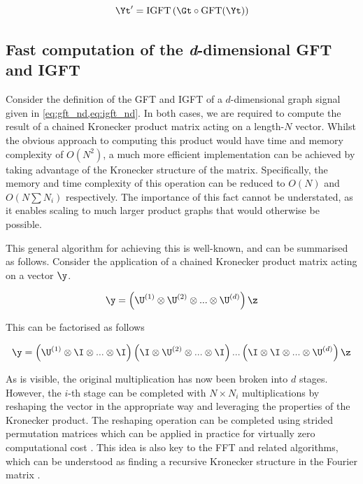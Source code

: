 \begin{equation}
    \Yt' = \text{IGFT} \left( \Gt \circ \text{GFT}(\Yt) \right)
\end{equation}

\subsection{Fast computation of the \textit{d}-dimensional GFT and IGFT}

\label{sec:fast_kron_dd}

Consider the definition of the GFT and IGFT of a $d$-dimensional graph signal given in \cref{eq:gft_nd,eq:igft_nd}. In both cases, we are required to compute the result of a chained Kronecker product matrix acting on a length-$N$ vector. Whilst the obvious approach to computing this product would have time and memory complexity of $O(N^2)$, a much more efficient implementation can be achieved by taking advantage of the Kronecker structure of the matrix. Specifically, the memory and time complexity of this operation can be reduced to $O(N)$ and $O(N\sum N_i)$ respectively. The importance of this fact cannot be understated, as it enables scaling to much larger product graphs that would otherwise be possible. 

This general algorithm for achieving this is well-known, and can be summarised as follows. Consider the application of a chained Kronecker product matrix acting on a vector $\y$. 

$$
\y = \left( \U^{(1)} \otimes \U^{(2)} \otimes ... \otimes \U^{(d)}\right) \z
$$

This can be factorised as follows

$$
\y = \left( \U^{(1)} \otimes \I \otimes ... \otimes \I \right)\left( \I \otimes \U^{(2)} \otimes ... \otimes \I \right) ... \left( \I \otimes \I \otimes ... \otimes \U^{(d)} \right) \z
$$

As is visible, the original multiplication has now been broken into $d$ stages. However, the $i$-th stage can be completed with $N \times N_i$ multiplications by reshaping the vector in the appropriate way and leveraging the properties of the Kronecker product. The reshaping operation can be completed using strided permutation matrices which can be applied in practice for virtually zero computational cost \citep{Granata1992}. This idea is also key to the FFT and related algorithms, which can be understood as finding a recursive Kronecker structure in the Fourier matrix \citep{Tolimieri2013}. 

